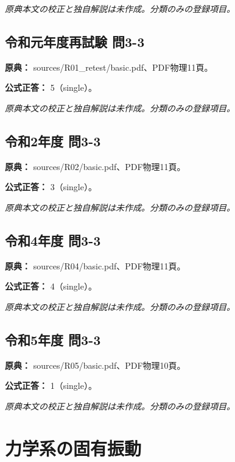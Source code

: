 \par\textit{原典本文の校正と独自解説は未作成。分類のみの登録項目。}

\subsection{令和元年度再試験 問3-3}
\label{q:r01-ret-basic-3-3}

\noindent\textbf{原典：} sources/R01\_retest/basic.pdf、PDF物理11頁。

\textbf{公式正答：} 5（single）。

\par\textit{原典本文の校正と独自解説は未作成。分類のみの登録項目。}

\subsection{令和2年度 問3-3}
\label{q:r02-reg-basic-3-3}

\noindent\textbf{原典：} sources/R02/basic.pdf、PDF物理11頁。

\textbf{公式正答：} 3（single）。

\par\textit{原典本文の校正と独自解説は未作成。分類のみの登録項目。}

\subsection{令和4年度 問3-3}
\label{q:r04-reg-basic-3-3}

\noindent\textbf{原典：} sources/R04/basic.pdf、PDF物理11頁。

\textbf{公式正答：} 4（single）。

\par\textit{原典本文の校正と独自解説は未作成。分類のみの登録項目。}

\subsection{令和5年度 問3-3}
\label{q:r05-reg-basic-3-3}

\noindent\textbf{原典：} sources/R05/basic.pdf、PDF物理10頁。

\textbf{公式正答：} 1（single）。

\par\textit{原典本文の校正と独自解説は未作成。分類のみの登録項目。}

\section{力学系の固有振動}

